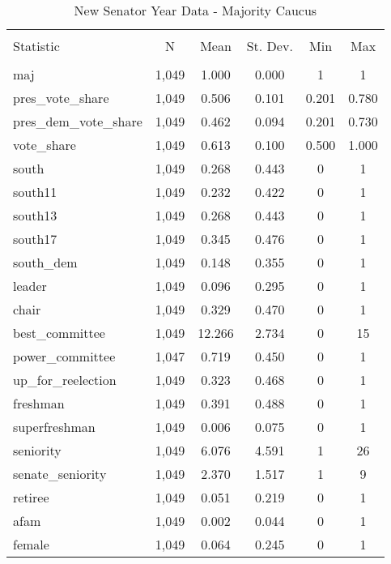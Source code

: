 \documentclass[12pt]{article}
\begin{document}
\begin{table}[!htbp] \centering 
	\caption{New Senator Year Data - Majority Caucus} 
	\begin{tabular}{@{\extracolsep{5pt}}lccccc} 
		\\[-1.8ex]\hline 
		\hline \\[-1.8ex] 
		Statistic & \multicolumn{1}{c}{N} & \multicolumn{1}{c}{Mean} & \multicolumn{1}{c}{St. Dev.} & \multicolumn{1}{c}{Min} & \multicolumn{1}{c}{Max} \\ 
		\hline \\[-1.8ex] 
		maj & 1,049 & 1.000 & 0.000 & 1 & 1 \\ 
		pres\_vote\_share & 1,049 & 0.506 & 0.101 & 0.201 & 0.780 \\ 
		pres\_dem\_vote\_share & 1,049 & 0.462 & 0.094 & 0.201 & 0.730 \\ 
		vote\_share & 1,049 & 0.613 & 0.100 & 0.500 & 1.000 \\ 
		south & 1,049 & 0.268 & 0.443 & 0 & 1 \\ 
		south11 & 1,049 & 0.232 & 0.422 & 0 & 1 \\ 
		south13 & 1,049 & 0.268 & 0.443 & 0 & 1 \\ 
		south17 & 1,049 & 0.345 & 0.476 & 0 & 1 \\ 
		south\_dem & 1,049 & 0.148 & 0.355 & 0 & 1 \\ 
		leader & 1,049 & 0.096 & 0.295 & 0 & 1 \\ 
		chair & 1,049 & 0.329 & 0.470 & 0 & 1 \\ 
		best\_committee & 1,049 & 12.266 & 2.734 & 0 & 15 \\ 
		power\_committee & 1,047 & 0.719 & 0.450 & 0 & 1 \\ 
		up\_for\_reelection & 1,049 & 0.323 & 0.468 & 0 & 1 \\ 
		freshman & 1,049 & 0.391 & 0.488 & 0 & 1 \\ 
		superfreshman & 1,049 & 0.006 & 0.075 & 0 & 1 \\ 
		seniority & 1,049 & 6.076 & 4.591 & 1 & 26 \\ 
		senate\_seniority & 1,049 & 2.370 & 1.517 & 1 & 9 \\ 
		retiree & 1,049 & 0.051 & 0.219 & 0 & 1 \\ 
		afam & 1,049 & 0.002 & 0.044 & 0 & 1 \\ 
		female & 1,049 & 0.064 & 0.245 & 0 & 1 \\ 

\end{tabular}
\end{table}
\end{document}

